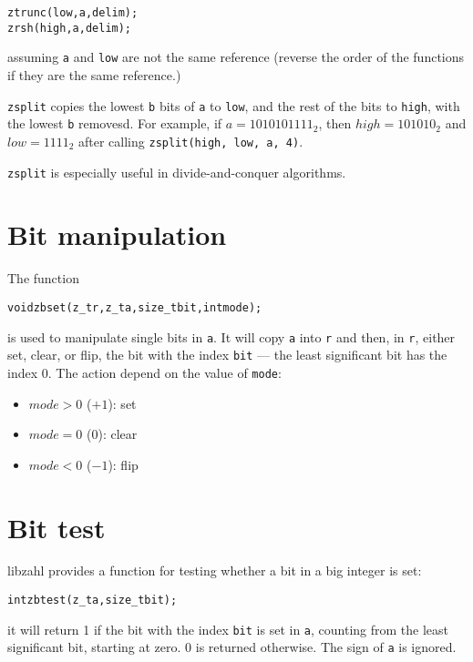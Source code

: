 \begin{alltt}
   ztrunc(low, a, delim);
   zrsh(high, a, delim);
\end{alltt}

\noindent
assuming {\tt a} and {\tt low} are not the
same reference (reverse the order of the
functions if they are the same reference.)

{\tt zsplit} copies the lowest {\tt b} bits
of {\tt a} to {\tt low}, and the rest of the
bits to {\tt high}, with the lowest {\tt b}
removesd. For example, if $a = 1010101111_2$,
then $high = 101010_2$ and $low = 1111_2$
after calling {\tt zsplit(high, low, a, 4)}.

{\tt zsplit} is especially useful in
divide-and-conquer algorithms.


\newpage
\section{Bit manipulation}
\label{sec:Bit manipulation}


The function

\begin{alltt}
   void zbset(z_t r, z_t a, size_t bit, int mode);
\end{alltt}

\noindent
is used to manipulate single bits in {\tt a}. It will
copy {\tt a} into {\tt r} and then, in {\tt r}, either
set, clear, or flip, the bit with the index {\tt bit}
— the least significant bit has the index 0. The
action depend on the value of {\tt mode}:

\begin{itemize}
\item
$mode > 0$ ($+1$): set
\item
$mode = 0$ ($0$): clear
\item
$mode < 0$ ($-1$): flip
\end{itemize}


\newpage
\section{Bit test}
\label{sec:Bit test}

libzahl provides a function for testing whether a bit
in a big integer is set:

\begin{alltt}
   int zbtest(z_t a, size_t bit);
\end{alltt}

\noindent
it will return 1 if the bit with the index {\tt bit}
is set in {\tt a}, counting from the least significant
bit, starting at zero. 0 is returned otherwise. The
sign of {\tt a} is ignored.

